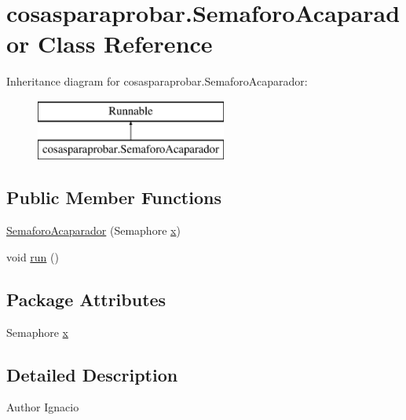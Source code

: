 \hypertarget{classcosasparaprobar_1_1_semaforo_acaparador}{}\section{cosasparaprobar.\+Semaforo\+Acaparador Class Reference}
\label{classcosasparaprobar_1_1_semaforo_acaparador}
Inheritance diagram for cosasparaprobar.\+Semaforo\+Acaparador\+:\begin{figure}[H]
\begin{center}
\leavevmode
\includegraphics[height=2.000000cm]{classcosasparaprobar_1_1_semaforo_acaparador}
\end{center}
\end{figure}
\subsection*{Public Member Functions}
\begin{DoxyCompactItemize}
\item 
\mbox{\hyperlink{classcosasparaprobar_1_1_semaforo_acaparador_a8ce5bf41c9493ee9cef15fe9111322ad}{Semaforo\+Acaparador}} (Semaphore \mbox{\hyperlink{classcosasparaprobar_1_1_semaforo_acaparador_a20c0bcd988d575bb629fe6aa1c2a1a72}{x}})
\item 
void \mbox{\hyperlink{classcosasparaprobar_1_1_semaforo_acaparador_aa13f77e80627c950231494ec075ac2fc}{run}} ()
\end{DoxyCompactItemize}
\subsection*{Package Attributes}
\begin{DoxyCompactItemize}
\item 
Semaphore \mbox{\hyperlink{classcosasparaprobar_1_1_semaforo_acaparador_a20c0bcd988d575bb629fe6aa1c2a1a72}{x}}
\end{DoxyCompactItemize}


\subsection{Detailed Description}
\begin{DoxyAuthor}{Author}
Ignacio 
\end{DoxyAuthor}


